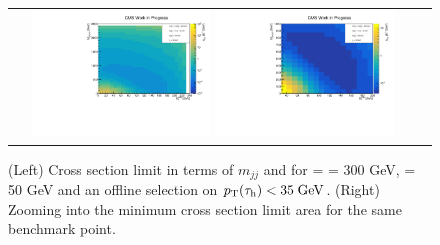 \begin{figure}[tbh!]
	\centering
	\begin{tabular}{cc}
		\includegraphics[width=0.45\textwidth]{analysis/pics/JetInvMass_vs_MET_xsec_chi300_lsp050_taupt35.pdf}
		\includegraphics[width=0.45\textwidth]{analysis/pics/JetInvMass_vs_MET_xsec_chi300_lsp050_taupt35_zoom.pdf} 		
	\end{tabular}
	\caption{(Left) Cross section limit in terms of $m_{jj}$ and \met for \charginopm = \neutralinotwo = 300 GeV, \neutralinoone = 50 GeV and an offline selection on $p_{\text{T}}(\tau_{\text{h}}) <  35\;\text{Ge}\kern-0.06667em\text{V}$. (Right) Zooming into the minimum cross section limit area for the same benchmark point.}
	\label{fig::JetInvMass_vs_MET_xsec_chi300_lsp050_taupt35}
\end{figure}

